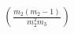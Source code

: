 \documentclass[preview]{standalone}
\begin{document}
\begin{align*}
\left(\frac{m_2(m_2 - 1)}{m_2^2 m_3}\right)
\end{align*}
\end{document}
